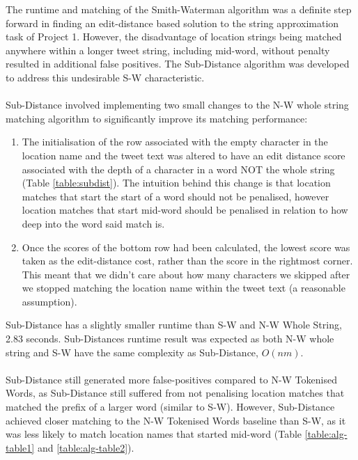 \documentclass[11pt,a4paper]{article}
\begin{document}
The runtime and matching of the Smith-Waterman algorithm was a definite step forward in finding an edit-distance based solution to the string approximation task of Project 1. However, the disadvantage of location strings being matched anywhere within a longer tweet string, including mid-word, without penalty resulted in additional false positives. The Sub-Distance algorithm was developed to address this undesirable S-W characteristic.\\\\
Sub-Distance involved implementing two small changes to the N-W whole string matching algorithm to significantly improve its matching performance:
\begin{enumerate}
\item The initialisation of the row associated with the empty character in the location name and the tweet text was altered to have an edit distance score associated with the depth of a character in a word NOT the whole string (Table \ref{table:subdist}). The intuition behind this change is that location matches that start the start of a word should not be penalised, however location matches that start mid-word should be penalised in relation to how deep into the word said match is.
\item Once the scores of the bottom row had been calculated, the lowest score was taken as the edit-distance cost, rather than the score in the rightmost corner. This meant that we didn't care about how many characters we skipped after we stopped matching the location name within the tweet text (a reasonable assumption). 
\end{enumerate}
Sub-Distance has a slightly smaller runtime than S-W and N-W Whole String, 2.83 seconds. Sub-Distances runtime result was expected as both N-W whole string and S-W have the same complexity as Sub-Distance, $O(nm)$.\\\\
Sub-Distance still generated more false-positives compared to N-W Tokenised Words, as Sub-Distance still suffered from not penalising location matches that matched the prefix of a larger word (similar to S-W). However, Sub-Distance achieved closer matching to the N-W Tokenised Words baseline than S-W, as it was less likely to match location names that started mid-word (Table \ref{table:alg-table1} and \ref{table:alg-table2}). 
\end{document}
